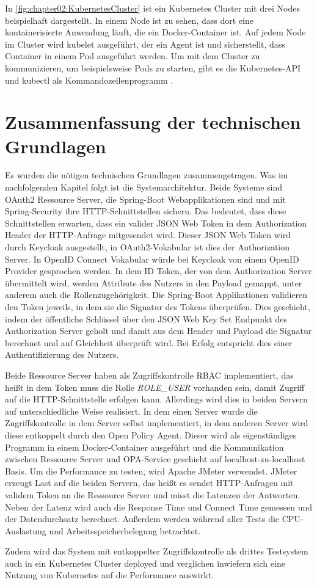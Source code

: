 In \autoref{fig:chapter02:KubernetesCluster} ist ein Kubernetes Cluster mit drei Nodes beispielhaft dargestellt. In einem Node ist zu sehen, dass dort eine kontainerisierte Anwendung läuft, die ein Docker-Container ist. Auf jedem Node im Cluster wird kubelet ausgeführt, der ein Agent ist und sicherstellt, dass Container in einem Pod ausgeführt werden. Um mit dem Cluster zu kommunizieren, um beispielsweise Pods zu starten, gibt es die Kubernetes-API und kubectl als Kommandozeilenprogramm \citep{kuberneteskubelet:2020}. 

\section{Zusammenfassung der technischen Grundlagen}
Es wurden die nötigen technischen Grundlagen zusammengetragen. Was im nachfolgenden Kapitel folgt ist die Systemarchitektur.
Beide Systeme sind OAuth2 Ressource Server, die Spring-Boot Webapplikationen sind und mit Spring-Security ihre HTTP-Schnittstellen sichern. Das bedeutet, dass diese Schnittstellen erwarten, dass ein valider JSON Web Token in dem Authorization Header der HTTP-Anfrage mitgesendet wird. Dieser JSON Web Token wird durch Keycloak ausgestellt, in OAuth2-Vokabular ist dies der Authorization Server. In OpenID Connect Vokabular würde bei Keycloak von einem OpenID Provider gesprochen werden. In dem ID Token, der von dem 
Authorization Server übermittelt wird, werden Attribute des Nutzers in den Payload 
gemappt, unter anderem auch die Rollenzugehörigkeit. Die Spring-Boot Applikationen 
validieren den Token jeweils, in dem sie die Signatur des Tokens überprüfen. Dies 
geschieht, indem der öffentliche Schlüssel über den JSON Web Key Set Endpunkt des Authorization 
Server geholt und damit aus dem Header und Payload die Signatur berechnet und auf 
Gleichheit überprüft wird. Bei Erfolg 
entspricht dies einer Authentifizierung des Nutzers.\smallskip

Beide Ressource Server haben als Zugriffskontrolle \ac{RBAC} 
implementiert, das heißt in dem Token muss die Rolle \emph{ROLE\_USER} vorhanden sein, damit 
Zugriff auf die HTTP-Schnittstelle erfolgen kann. Allerdings wird dies in beiden Servern auf 
unterschiedliche Weise realisiert. In dem einen Server wurde die Zugriffskontrolle in dem Server 
selbst implementiert, in dem anderen Server wird diese entkoppelt durch den Open Policy Agent. 
Dieser wird als eigenständiges Programm in einem Docker-Container ausgeführt und die 
Kommunikation zwischen Ressource Server und OPA-Service geschieht auf localhost-zu-localhost Basis. 
Um die Performance zu testen, wird Apache JMeter verwendet. JMeter erzeugt Last auf die 
beiden Servern, das heißt es sendet HTTP-Anfragen mit validem Token an die Ressource 
Server und misst die Latenzen der Antworten. Neben der Latenz wird auch die Response 
Time und Connect Time gemessen und der Datendurchsatz berechnet. Außerdem werden während aller Tests die CPU-Auslastung und Arbeitsspeicherbelegung betrachtet.\smallskip

Zudem wird das System mit entkoppelter Zugriffskontrolle als drittes Testsystem auch in ein Kubernetes Cluster deployed und verglichen inwiefern sich eine Nutzung von Kubernetes auf die Performance auswirkt. 